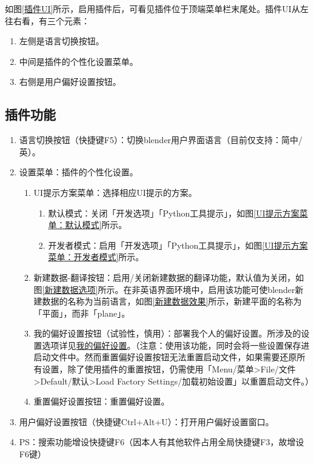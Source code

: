 \documentclass{../../PublicResources/DocClass}
\begin{document}
    如图\ref{插件UI}所示，启用插件后，可看见插件位于顶端菜单栏末尾处。插件UI从左往右看，有三个元素：
    \begin{enumerate}
        \item 左侧是语言切换按钮。
        \item 中间是插件的个性化设置菜单。
        \item 右侧是用户偏好设置按钮。
    \end{enumerate}

    \subsection{插件功能}
    \hypertarget{AddonFeatures}{}
    \begin{enumerate}
        \item 语言切换按钮（快捷键F5）：切换blender用户界面语言（目前仅支持：简中/英）。
        \item 设置菜单：插件的个性化设置。
        \begin{enumerate}
            \item UI提示方案菜单：选择相应UI提示的方案。
            \begin{enumerate}
                \item 默认模式：关闭「开发选项」「Python工具提示」，如图\ref{UI提示方案菜单：默认模式}所示。
                \item 开发者模式：启用「开发选项」「Python工具提示」，如图\ref{UI提示方案菜单：开发者模式}所示。
            \end{enumerate}
            \item 新建数据-翻译按钮：启用/关闭新建数据的翻译功能，默认值为关闭，如图\ref{新建数据选项}所示。在非英语界面环境中，启用该功能可使blender新建数据的名称为当前语言，如图\ref{新建数据效果}所示，新建平面的名称为「平面」，而非「plane」。
            \item 我的偏好设置按钮（{\color{red}试验性，慎用}）：部署我个人的偏好设置。所涉及的设置选项详见\hyperlink{MyPreferences}{我的偏好设置}。（注意：使用该功能，同时会将一些设置保存进启动文件中。然而重置偏好设置按钮无法重置启动文件，如果需要还原所有设置，除了使用插件的重置按钮，仍需使用「Menu/菜单>File/文件>Default/默认>Load Factory Settings/加载初始设置」以重置启动文件。）
            \item 重置偏好设置按钮：重置偏好设置。
        \end{enumerate}
        \item 用户偏好设置按钮（快捷键Ctrl+Alt+U）：打开用户偏好设置窗口。
        \item PS：搜索功能增设快捷键F6（因本人有其他软件占用全局快捷键F3，故增设F6键）
    \end{enumerate}
\end{document}
